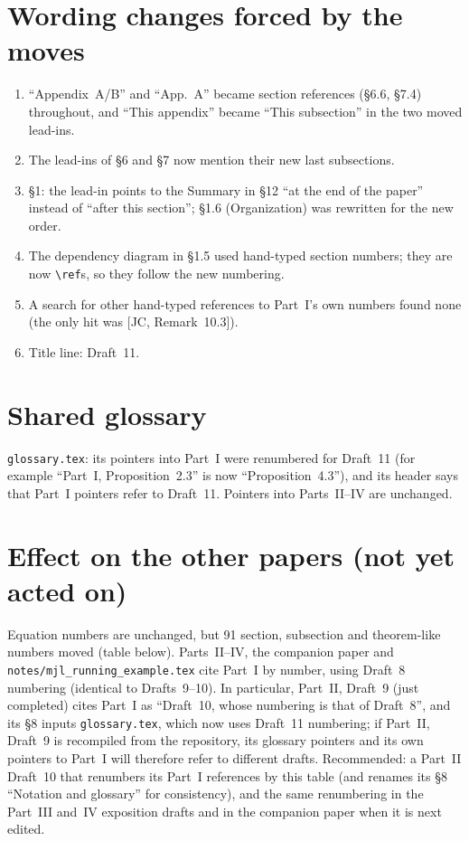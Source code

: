 \documentclass[11pt]{article}
\begin{document}
\section*{Wording changes forced by the moves}
\begin{enumerate}[leftmargin=*]
\item ``Appendix~A/B'' and ``App.~A'' became section references
(\S6.6, \S7.4) throughout, and ``This appendix'' became ``This
subsection'' in the two moved lead-ins.
\item The lead-ins of \S6 and \S7 now mention their new last
subsections.
\item \S1: the lead-in points to the Summary in \S12 ``at the end of the
paper'' instead of ``after this section''; \S1.6 (Organization) was
rewritten for the new order.
\item The dependency diagram in \S1.5 used hand-typed section numbers;
they are now \verb|\ref|s, so they follow the new numbering.
\item A search for other hand-typed references to Part~I's own numbers
found none (the only hit was [JC, Remark~10.3]).
\item Title line: Draft~11.
\end{enumerate}

\section*{Shared glossary}
\texttt{glossary.tex}: its pointers into Part~I were renumbered for
Draft~11 (for example ``Part~I, Proposition~2.3'' is now
``Proposition~4.3''), and its header says that Part~I pointers refer to
Draft~11.  Pointers into Parts~II--IV are unchanged.

\section*{Effect on the other papers (not yet acted on)}
Equation numbers are unchanged, but 91 section, subsection and
theorem-like numbers moved (table below).  Parts~II--IV, the companion
paper and \texttt{notes/mjl\_running\_example.tex} cite Part~I by
number, using Draft~8 numbering (identical to Drafts~9--10).  In
particular, Part~II, Draft~9 (just completed) cites Part~I as
``Draft~10, whose numbering is that of Draft~8'', and its \S8 inputs
\texttt{glossary.tex}, which now uses Draft~11 numbering; if Part~II,
Draft~9 is recompiled from the repository, its glossary pointers and
its own pointers to Part~I will therefore refer to different drafts.
Recommended: a Part~II Draft~10 that renumbers its Part~I references
by this table (and renames its \S8 ``Notation and glossary'' for
consistency), and the same renumbering in the Part~III and~IV
exposition drafts and in the companion paper when it is next edited.
\end{document}
